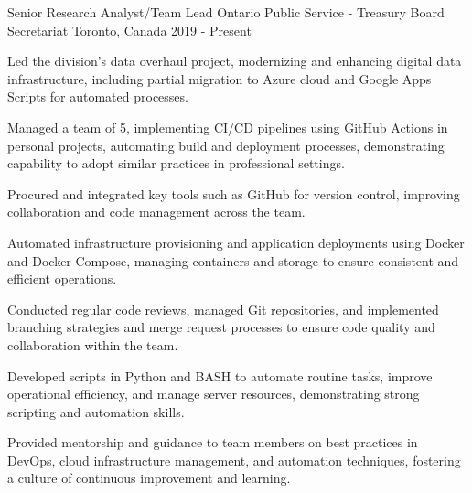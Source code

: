 
\begin{cventries}

\cventry
	{Senior Research Analyst/Team Lead}
	{Ontario Public Service - Treasury Board Secretariat}
	{Toronto, Canada}
	{2019 - Present}
	{
		\begin{cvitems}
			\item Led the division's data overhaul project, modernizing and enhancing digital data infrastructure, including partial migration to Azure cloud and Google Apps Scripts for automated processes.
			\item Managed a team of 5, implementing CI/CD pipelines using GitHub Actions in personal projects, automating build and deployment processes, demonstrating capability to adopt similar practices in professional settings.
			\item Procured and integrated key tools such as GitHub for version control, improving collaboration and code management across the team.
			\item Automated infrastructure provisioning and application deployments using Docker and Docker-Compose, managing containers and storage to ensure consistent and efficient operations.
			\item Conducted regular code reviews, managed Git repositories, and implemented branching strategies and merge request processes to ensure code quality and collaboration within the team.
			\item Developed scripts in Python and BASH to automate routine tasks, improve operational efficiency, and manage server resources, demonstrating strong scripting and automation skills.
			\item Provided mentorship and guidance to team members on best practices in DevOps, cloud infrastructure management, and automation techniques, fostering a culture of continuous improvement and learning.
		\end{cvitems}
	}


\end{cventries}
